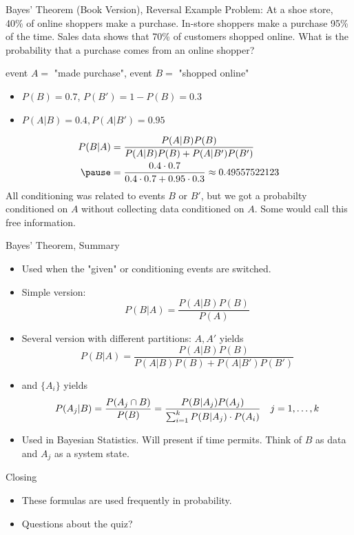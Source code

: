 \documentclass[handout]{beamer}
\begin{document}
    \begin{frame}{Bayes' Theorem (Book Version), Reversal Example}
        Problem: At a shoe store, 40\% of online shoppers make a purchase. In-store shoppers make a purchase 95\% of the time. Sales data shows that 70\% of customers shopped online. What is the probability that a purchase comes from an online shopper?
        \pause \begin{center}
            event $A =$ "made purchase", event $B =$ "shopped online"
        \end{center}
        \begin{itemize}
            \pause \item $P(B) = 0.7$, $P(B') = 1 - P(B) = 0.3$
            \item $P(A|B) = 0.4, P(A|B') = 0.95$
        \end{itemize}
        \begin{align*}
            P(B|A) &= \frac{P(A|B)P(B)}{P(A|B)P(B) + P(A|B')P(B')} \\
             \pause &= \frac{0.4\cdot 0.7}{0.4 \cdot 0.7 + 0.95 \cdot 0.3} \approx 0.49557522123
        \end{align*}
        \pause All conditioning was related to events $B$ or $B'$, but we got a probabilty conditioned on $A$ without collecting data conditioned on $A$. Some would call this free information.
    \end{frame}

    \begin{frame}{Bayes' Theorem, Summary}
    
        \begin{itemize}
            \item Used when the "given" or conditioning events are switched.
            \item Simple version:
            \[P(B|A) = \frac{P(A|B)P(B)}{P(A)}\]
            \item Several version with different partitions: ${A,A'}$ yields
            $$P(B|A) = \frac{P(A|B)P(B)}{P(A|B)P(B) + P(A|B')P(B')} $$
            \item and $\{A_i\}$ yields
            $$ P(A_j|B) = \frac{P(A_j\cap B)}{P(B)} = \frac{P(B|A_j)P(A_j)}{\sum_{i=1}^k P(B|A_j)\cdot P(A_i)} \hskip 1em j = 1, \ldots, k$$
            \item Used in Bayesian Statistics. Will present if time permits. Think of $B$ as data and $A_j$ as a system state.
        \end{itemize}
    \end{frame}

    \begin{frame}{Closing}
    
        \begin{itemize}
            \item These formulas are used frequently in probability.
            \item Questions about the quiz?
        \end{itemize}
    \end{frame}
\end{document}
